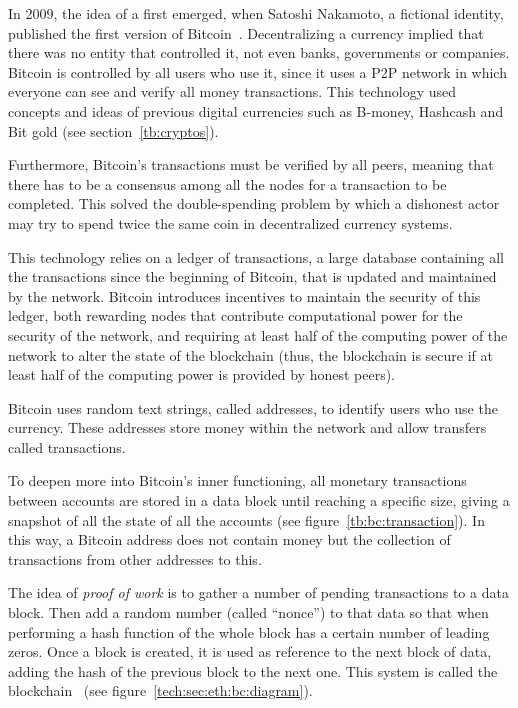 In 2009, the idea of a  first emerged, when
Satoshi Nakamoto, a fictional identity, published the first version of
Bitcoin~\cite{nakamoto2008bitcoin}. Decentralizing a currency implied that there
was no entity that controlled it, not even banks, governments or companies.
Bitcoin is controlled by all users who use it, since it uses a P2P network in
which everyone can see and verify all money transactions. This technology used
concepts and ideas of previous digital currencies such as B-money, Hashcash and
Bit gold (see section~\ref{tb:cryptos}).

Furthermore, Bitcoin's transactions must be verified by all peers, meaning that
there has to be a consensus among all the nodes for a transaction to be
completed. This solved the double-spending problem by which a dishonest actor
may try to spend twice the same coin in decentralized currency systems.

This technology relies on a ledger of transactions, a large database containing
all the transactions since the beginning of Bitcoin, that is updated and
maintained by the network. Bitcoin introduces incentives to maintain the
security of this ledger, both rewarding nodes that contribute computational
power for the security of the network, and requiring at least half of the
computing power of the network to alter the state of the blockchain (thus, the
blockchain is secure if at least half of the computing power is provided by
honest peers).

Bitcoin uses random text strings, called addresses, to identify users who use
the currency. These addresses store money within the network and allow transfers
called transactions.

To deepen more into Bitcoin's inner functioning, all monetary transactions
between accounts are stored in a data block until reaching a specific size,
giving a snapshot of all the state of all the accounts (see
figure~\ref{tb:bc:transaction}). In this way, a Bitcoin address does not contain
money but the collection of transactions from other addresses to this.

The idea of \emph{proof of work} is to gather a number of pending transactions
to a data block. Then add a random number (called ``nonce'') to that data so
that when performing a hash function of the whole block has a certain number of
leading zeros. Once a block is created, it is used as reference to the next
block of data, adding the hash of the previous block to the next one. This
system is called the blockchain~\cite{antonopoulos2014mastering} (see
figure~\ref{tech:sec:eth:bc:diagram}).

